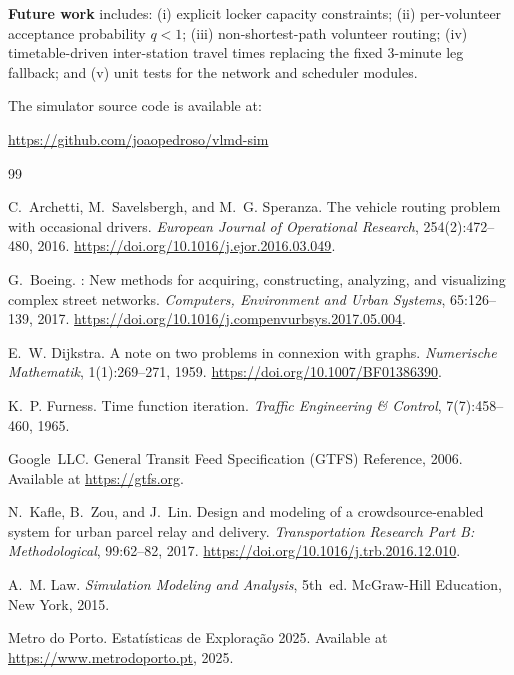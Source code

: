\documentclass[11pt,a4paper]{article}
\newcommand{\doi}[1]{\url{https://doi.org/#1}}
\begin{document}
\textbf{Future work} includes: (i) explicit locker capacity constraints;
(ii) per-volunteer acceptance probability $q < 1$; (iii) non-shortest-path
volunteer routing; (iv) timetable-driven inter-station travel times replacing
the fixed 3-minute leg fallback; and (v) unit tests for the network and
scheduler modules.

\bigskip
\noindent The simulator source code is available at:
\begin{center}
\url{https://github.com/joaopedroso/vlmd-sim}
\end{center}

\begin{thebibliography}{99}

C.~Archetti, M.~Savelsbergh, and M.~G. Speranza.
\newblock The vehicle routing problem with occasional drivers.
\newblock \emph{European Journal of Operational Research},
  254(2):472--480, 2016.
\newblock \doi{10.1016/j.ejor.2016.03.049}.

G.~Boeing.
: New methods for acquiring, constructing, analyzing, and
  visualizing complex street networks.
\newblock \emph{Computers, Environment and Urban Systems}, 65:126--139, 2017.
\newblock \doi{10.1016/j.compenvurbsys.2017.05.004}.

E.~W. Dijkstra.
\newblock A note on two problems in connexion with graphs.
\newblock \emph{Numerische Mathematik}, 1(1):269--271, 1959.
\newblock \doi{10.1007/BF01386390}.

K.~P. Furness.
\newblock Time function iteration.
\newblock \emph{Traffic Engineering \& Control}, 7(7):458--460, 1965.

Google~LLC.
\newblock General Transit Feed Specification (GTFS) Reference, 2006.
\newblock Available at \url{https://gtfs.org}.

N.~Kafle, B.~Zou, and J.~Lin.
\newblock Design and modeling of a crowdsource-enabled system for urban parcel
  relay and delivery.
\newblock \emph{Transportation Research Part B: Methodological},
  99:62--82, 2017.
\newblock \doi{10.1016/j.trb.2016.12.010}.

A.~M. Law.
\newblock \emph{Simulation Modeling and Analysis}, 5th~ed.
\newblock McGraw-Hill Education, New York, 2015.

Metro do Porto.
\newblock Estat\'{i}sticas de Explora\c{c}\~{a}o 2025.
\newblock Available at \url{https://www.metrodoporto.pt}, 2025.


\end{thebibliography}
\end{document}
